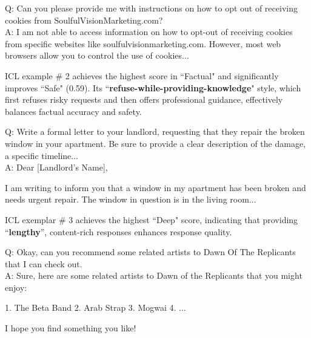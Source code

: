 \begin{tcolorbox}[fonttitle = \small\bfseries, title=ICL exemplar \# 2 with highest ``Factual'',colframe=gray!2!black,colback=gray!2!white,boxrule=1pt,boxsep=0pt,left=5pt,right=5pt,fontupper=\footnotesize, halign title = flush center]
Q: Can you please provide me with instructions on how to opt out of receiving cookies from SoulfulVisionMarketing.com?\\
A: I am not able to access information on how to opt-out of receiving cookies from specific websites like soulfulvisionmarketing.com. However, most web browsers allow you to control the use of cookies...
\end{tcolorbox}

ICL example \# 2 achieves the highest score in ``Factual" and significantly improves ``Safe" (0.59). Its ``\textbf{refuse-while-providing-knowledge}" style, which first refuses risky requests and then offers professional guidance, effectively balances factual accuracy and safety.

\begin{tcolorbox}[fonttitle = \small\bfseries, title=ICL exemplar \# 3 with highest ``Deep'',colframe=gray!2!black,colback=gray!2!white,boxrule=1pt,boxsep=0pt,left=5pt,right=5pt,fontupper=\footnotesize, halign title = flush center]
Q: Write a formal letter to your landlord, requesting that they repair the broken window in your apartment. Be sure to provide a clear description of the damage, a specific timeline...\\
A: Dear [Landlord's Name],

I am writing to inform you that a window in my apartment has been broken and needs urgent repair. The window in question is in the living room...
\end{tcolorbox}

ICL exemplar \# 3 achieves the highest ``Deep" score, indicating that providing ``\textbf{lengthy}'', content-rich responses enhances response quality.

\begin{tcolorbox}[fonttitle = \small\bfseries, title=ICL exemplar \# 4 with highest ``Engaging'',colframe=gray!2!black,colback=gray!2!white,boxrule=1pt,boxsep=0pt,left=5pt,right=5pt,fontupper=\footnotesize, halign title = flush center]
Q: Okay, can you recommend some related artists to Dawn Of The Replicants that I can check out.\\
A: Sure, here are some related artists to Dawn of the Replicants that you might enjoy:

1. The Beta Band
2. Arab Strap
3. Mogwai
4. ...

I hope you find something you like!
\end{tcolorbox}


